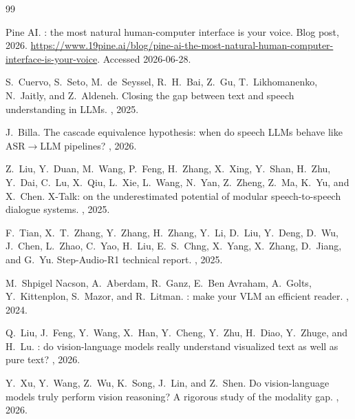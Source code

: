 \documentclass[11pt]{article}
\begin{document}

\begin{thebibliography}{99}

{Pine AI}.
: the most natural human-computer interface is your voice.
\newblock Blog post, 2026.
\newblock \url{https://www.19pine.ai/blog/pine-ai-the-most-natural-human-computer-interface-is-your-voice}. Accessed 2026-06-28.

S.~Cuervo, S.~Seto, M.~de~Seyssel, R.~H.~Bai, Z.~Gu, T.~Likhomanenko, N.~Jaitly, and Z.~Aldeneh.
\newblock Closing the gap between text and speech understanding in LLMs.
, 2025.

J.~Billa.
\newblock The cascade equivalence hypothesis: when do speech LLMs behave like ASR$\to$LLM pipelines?
, 2026.

Z.~Liu, Y.~Duan, M.~Wang, P.~Feng, H.~Zhang, X.~Xing, Y.~Shan, H.~Zhu, Y.~Dai, C.~Lu, X.~Qiu, L.~Xie, L.~Wang, N.~Yan, Z.~Zheng, Z.~Ma, K.~Yu, and X.~Chen.
\newblock X-{T}alk: on the underestimated potential of modular speech-to-speech dialogue systems.
, 2025.

F.~Tian, X.~T.~Zhang, Y.~Zhang, H.~Zhang, Y.~Li, D.~Liu, Y.~Deng, D.~Wu, J.~Chen, L.~Zhao, C.~Yao, H.~Liu, E.~S.~Chng, X.~Yang, X.~Zhang, D.~Jiang, and G.~Yu.
\newblock Step-{A}udio-{R}1 technical report.
, 2025.

M.~Shpigel Nacson, A.~Aberdam, R.~Ganz, E.~Ben Avraham, A.~Golts, Y.~Kittenplon, S.~Mazor, and R.~Litman.
: make your {VLM} an efficient reader.
, 2024.

Q.~Liu, J.~Feng, Y.~Wang, X.~Han, Y.~Cheng, Y.~Zhu, H.~Diao, Y.~Zhuge, and H.~Lu.
: do vision-language models really understand visualized text as well as pure text?
, 2026.

Y.~Xu, Y.~Wang, Z.~Wu, K.~Song, J.~Lin, and Z.~Shen.
\newblock Do vision-language models truly perform vision reasoning? {A} rigorous study of the modality gap.
, 2026.


\end{thebibliography}
\end{document}
